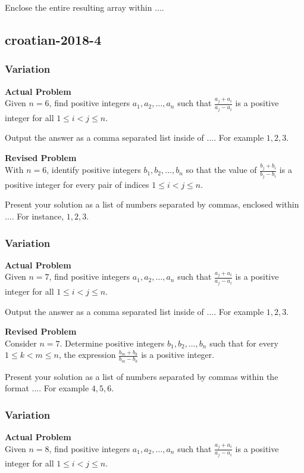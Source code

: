 Enclose the entire resulting array within $\boxed{...}$.

\subsection{croatian-2018-4}
\subsubsection{Variation}
\textbf{Actual Problem}\\
Given $n = 6$, find positive integers $a_1, a_2, \ldots, a_n$ such that $\frac{a_j+a_i}{a_j-a_i}$ is a positive integer for all $1 \le i < j \le n$.

Output the answer as a comma separated list inside of $\boxed{...}$. For example $\boxed{1, 2, 3}$.

\textbf{Revised Problem}\\
With $n = 6$, identify positive integers $b_1, b_2, \ldots, b_n$ so that the value of $\frac{b_j+b_i}{b_j-b_i}$ is a positive integer for every pair of indices $1 \le i < j \le n$.

Present your solution as a list of numbers separated by commas, enclosed within $\boxed{...}$. For instance, $\boxed{1, 2, 3}$.

\subsubsection{Variation}
\textbf{Actual Problem}\\
Given $n = 7$, find positive integers $a_1, a_2, \ldots, a_n$ such that $\frac{a_j+a_i}{a_j-a_i}$ is a positive integer for all $1 \le i < j \le n$.

Output the answer as a comma separated list inside of $\boxed{...}$. For example $\boxed{1, 2, 3}$.

\textbf{Revised Problem}\\
Consider $n = 7$. Determine positive integers $b_1, b_2, \ldots, b_n$ such that for every $1 \le k < m \le n$, the expression $\frac{b_m+b_k}{b_m-b_k}$ is a positive integer.

Present your solution as a list of numbers separated by commas within the format $\boxed{...}$. For example $\boxed{4, 5, 6}$.

\subsubsection{Variation}
\textbf{Actual Problem}\\
Given $n = 8$, find positive integers $a_1, a_2, \ldots, a_n$ such that $\frac{a_j+a_i}{a_j-a_i}$ is a positive integer for all $1 \le i < j \le n$.

